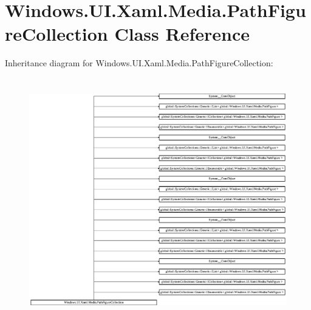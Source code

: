\hypertarget{class_windows_1_1_u_i_1_1_xaml_1_1_media_1_1_path_figure_collection}{}\section{Windows.\+U\+I.\+Xaml.\+Media.\+Path\+Figure\+Collection Class Reference}
\label{class_windows_1_1_u_i_1_1_xaml_1_1_media_1_1_path_figure_collection}
Inheritance diagram for Windows.\+U\+I.\+Xaml.\+Media.\+Path\+Figure\+Collection\+:\begin{figure}[H]
\begin{center}
\leavevmode
\includegraphics[height=10.594595cm]{class_windows_1_1_u_i_1_1_xaml_1_1_media_1_1_path_figure_collection}
\end{center}
\end{figure}
